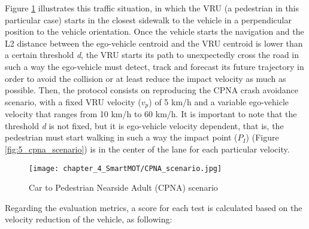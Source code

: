 Figure \ref{fig:chapter_4_SmartMOT/CPNA_scenario} illustrates this traffic situation, in which the VRU (a pedestrian in this particular case) starts in the closest sidewalk to the vehicle in a perpendicular position to the vehicle orientation. Once the vehicle starts the navigation and the L2 distance between the ego-vehicle centroid and the VRU centroid is lower than a certain threshold \textit{d}, the VRU starts its path to unexpectedly cross the road in such a way the ego-vehicle must detect, track and forecast its future trajectory in order to avoid the collision or at least reduce the impact velocity as much as possible. Then, the protocol consists on reproducing the CPNA crash avoidance scenario, with a fixed VRU velocity (\(v_p\)) of 5 km/h and a variable ego-vehicle velocity that ranges from 10 km/h to 60 km/h. It is important to note that the threshold \textit{d} is not fixed, but it is ego-vehicle velocity dependent, that is, the pedestrian must start walking in such a way the impact point (\(P_I\)) (Figure \ref{fig:5_cpna_scenario}) is in the center of the lane for each particular velocity. 

\begin{figure}[h]
	\centering\texttt{[image: chapter\_4\_SmartMOT/CPNA\_scenario.jpg]}
	\caption{Car to Pedestrian Nearside Adult (CPNA) scenario}	
	\label{fig:chapter_4_SmartMOT/CPNA_scenario}
\end{figure}

Regarding the evaluation metrics, a score for each test is calculated based on the velocity reduction of the vehicle, as following:

